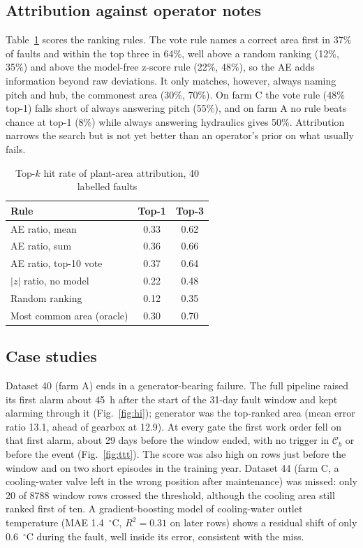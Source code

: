 \documentclass[conference]{IEEEtran}
\begin{document}
\subsection{Attribution against operator notes}
Table~\ref{tab:attribution} scores the ranking rules. The vote rule names a correct area first in 37\% of faults and within the top three in 64\%, well above a random ranking (12\%, 35\%) and above the model-free z-score rule (22\%, 48\%), so the AE adds information beyond raw deviations. It only matches, however, always naming pitch and hub, the commonest area (30\%, 70\%). On farm C the vote rule (48\% top-1) falls short of always answering pitch (55\%), and on farm A no rule beats chance at top-1 (8\%) while always answering hydraulics gives 50\%. Attribution narrows the search but is not yet better than an operator's prior on what usually fails.

\begin{table}[t]
\caption{Top-$k$ hit rate of plant-area attribution, 40 labelled faults}
\label{tab:attribution}
\centering
\begin{tabular}{lcc}
\toprule
Rule & Top-1 & Top-3\\
\midrule
AE ratio, mean & 0.33 & 0.62\\
AE ratio, sum & 0.36 & 0.66\\
AE ratio, top-10 vote & 0.37 & 0.64\\
$|z|$ ratio, no model & 0.22 & 0.48\\
Random ranking & 0.12 & 0.35\\
Most common area (oracle) & 0.30 & 0.70\\
\bottomrule
\end{tabular}
\end{table}

\subsection{Case studies}
Dataset 40 (farm A) ends in a generator-bearing failure. The full pipeline raised its first alarm about 45~h after the start of the 31-day fault window and kept alarming through it (Fig.~\ref{fig:hi}); generator was the top-ranked area (mean error ratio 13.1, ahead of gearbox at 12.9). At every gate the first work order fell on that first alarm, about 29 days before the window ended, with no trigger in $\mathcal{C}_b$ or before the event (Fig.~\ref{fig:ttt}). The score was also high on rows just before the window and on two short episodes in the training year. Dataset 44 (farm C, a cooling-water valve left in the wrong position after maintenance) was missed: only 20 of 8788 window rows crossed the threshold, although the cooling area still ranked first of ten. A gradient-boosting model of cooling-water outlet temperature (MAE 1.4~$^\circ$C, $R^2=0.31$ on later rows) shows a residual shift of only 0.6~$^\circ$C during the fault, well inside its error, consistent with the miss.
\end{document}
